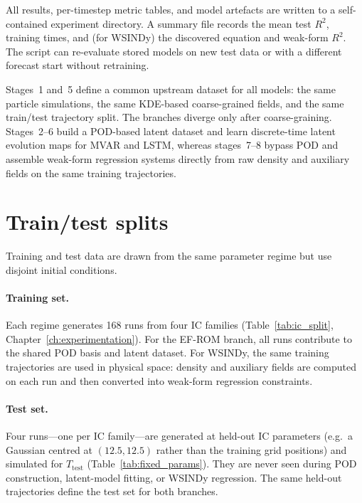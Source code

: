 \documentclass{report}
\theoremstyle{plain}
\theoremstyle{remark}
\numberwithin{equation}{section}              %
\begin{document}
\noindent
All results, per-timestep metric tables, and model artefacts are written to a
self-contained experiment directory.  A summary
file  records the mean test $R^2$, training times, and
(for WSINDy) the discovered equation and weak-form $R^2$.  The script
 can re-evaluate stored models on new test data or
with a different forecast start without retraining.

\noindent
Stages~1 and~5 define a common upstream dataset for all models: the same
particle simulations, the same KDE-based coarse-grained fields, and the same
train/test trajectory split.  The branches diverge only after coarse-graining.
Stages~2--6 build a POD-based latent dataset and learn discrete-time latent
evolution maps for MVAR and LSTM, whereas stages~7--8 bypass POD and assemble
weak-form regression systems directly from raw density and auxiliary fields on
the same training trajectories.

%
\section{Train/test splits}
\label{sec:splits}

Training and test data are drawn from the same parameter regime but use
disjoint initial conditions.

\paragraph{Training set.}
Each regime generates 168 runs from four IC families
(Table~\ref{tab:ic_split}, Chapter~\ref{ch:experimentation}).
For the EF-ROM branch, all runs contribute to the shared POD basis and latent
dataset.  For WSINDy, the same training trajectories are used in physical
space: density and auxiliary fields are computed on each run and then
converted into weak-form regression constraints.

\paragraph{Test set.}
Four runs---one per IC family---are generated at held-out IC parameters
(e.g.\ a Gaussian centred at $(12.5,12.5)$ rather than the training grid
positions) and simulated for $T_{\mathrm{test}}$ (Table~\ref{tab:fixed_params}).
They are never seen during POD construction, latent-model fitting, or WSINDy
regression.  The same held-out trajectories define the test set for both
branches.
\end{document}
